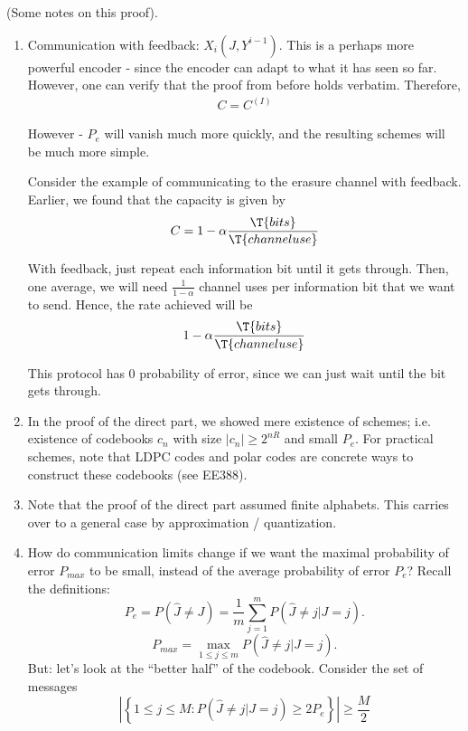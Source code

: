 \begin{remark} (Some notes on this proof).
  \begin{enumerate}
    \item Communication with feedback: $X_i(J, Y^{i-1})$.  This is a perhaps more powerful encoder - since the encoder can adapt to what it has seen so far.  However, one can verify that the proof from before holds verbatim.  Therefore,
      \begin{align*}
        C = C^{(I)} \tag{with or without feedback}
      \end{align*}

      However - $P_e$ will vanish much more quickly, and the resulting schemes will be much more simple.

      Consider the example of communicating to the erasure channel with feedback.  Earlier, we found that the capacity is given by
      \begin{align*}
        C = 1 - \alpha \frac{\T{bits}}{\T{channel use}}
      \end{align*}

      With feedback, just repeat each information bit until it gets through.  Then, one average, we will need $\frac{1}{1 - \alpha}$ channel uses per information bit that we want to send.  Hence, the rate achieved will be
      \begin{align*}
        1 - \alpha \frac{\T{bits}}{\T{channel use}}
      \end{align*}

      This protocol has 0 probability of error, since we can just wait until the bit gets through.

    \item In the proof of the direct part, we showed mere existence of schemes; i.e. existence of codebooks $c_n$ with size $|c_n| \geq 2^{nR}$ and small $P_e$.  For practical schemes, note that LDPC codes and polar codes are concrete ways to construct these codebooks (see EE388).

    \item Note that the proof of the direct part assumed finite alphabets.  This carries over to a general case by approximation / quantization.

    \item How do communication limits change if we want the maximal probability of error $P_{max}$ to be small, instead of the average probability of error $P_e$?  Recall the definitions:
      \[
        P_e = P(\hat{J} \neq J) = \frac{1}{m} \sum_{j=1}^{m} P(\hat{J} \neq j | J = j).
      \]
      \[
        P_{max} = \max_{1 \leq j \leq m} P(\hat{J} \neq j | J = j).
      \]
      But: let's look at the ``better half'' of the codebook.  Consider the set of messages 
      \[
        | \left\{ 1 \leq j \leq M: P(\hat{J} \neq j | J = j) \geq 2 P_e \right\} | \geq \frac{M}{2} \tag{by Markov's inequality}
      \]


\end{enumerate}
\end{remark}
